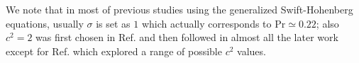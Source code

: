 \documentclass[preprint,prx,floatfix]{revtex4-1}
\begin{document}
We note that in most of previous studies using the generalized Swift-Hohenberg equations, usually $\sigma$ is set as $1$ which actually corresponds to $\text{Pr} \simeq 0.22$; also $c^2=2$ was first chosen in Ref. \cite{xi1993spiral} and then followed in almost all the later work except for Ref. \cite{karimi2011exploring} which explored a range of possible $c^2$ values.


%

\end{document}
